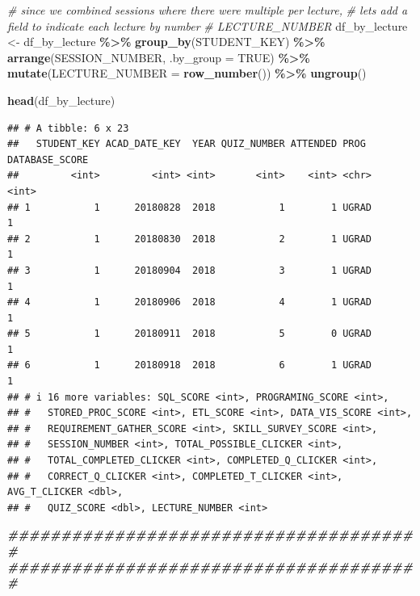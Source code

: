 \documentclass[
]{article}
\newenvironment{Shaded}{\begin{snugshade}}{\end{snugshade}}
\newcommand{\AttributeTok}[1]{\textcolor[rgb]{0.13,0.29,0.53}{#1}}
\newcommand{\CommentTok}[1]{\textcolor[rgb]{0.56,0.35,0.01}{\textit{#1}}}
\newcommand{\ConstantTok}[1]{\textcolor[rgb]{0.56,0.35,0.01}{#1}}
\newcommand{\DocumentationTok}[1]{\textcolor[rgb]{0.56,0.35,0.01}{\textbf{\textit{#1}}}}
\newcommand{\FunctionTok}[1]{\textcolor[rgb]{0.13,0.29,0.53}{\textbf{#1}}}
\newcommand{\NormalTok}[1]{#1}
\newcommand{\OtherTok}[1]{\textcolor[rgb]{0.56,0.35,0.01}{#1}}
\newcommand{\SpecialCharTok}[1]{\textcolor[rgb]{0.81,0.36,0.00}{\textbf{#1}}}
\begin{document}
\begin{Shaded}
\begin{Highlighting}[]
\CommentTok{\# since we combined sessions where there were multiple per lecture,}
\CommentTok{\# let\textquotesingle{}s add a field to indicate each lecture by number}
\CommentTok{\# LECTURE\_NUMBER}
\NormalTok{df\_by\_lecture }\OtherTok{\textless{}{-}}\NormalTok{ df\_by\_lecture }\SpecialCharTok{\%\textgreater{}\%}
  \FunctionTok{group\_by}\NormalTok{(STUDENT\_KEY) }\SpecialCharTok{\%\textgreater{}\%}
  \FunctionTok{arrange}\NormalTok{(SESSION\_NUMBER, }\AttributeTok{.by\_group =} \ConstantTok{TRUE}\NormalTok{) }\SpecialCharTok{\%\textgreater{}\%}
  \FunctionTok{mutate}\NormalTok{(}\AttributeTok{LECTURE\_NUMBER =} \FunctionTok{row\_number}\NormalTok{()) }\SpecialCharTok{\%\textgreater{}\%}
  \FunctionTok{ungroup}\NormalTok{()}

\FunctionTok{head}\NormalTok{(df\_by\_lecture)}
\end{Highlighting}
\end{Shaded}

\begin{verbatim}
## # A tibble: 6 x 23
##   STUDENT_KEY ACAD_DATE_KEY  YEAR QUIZ_NUMBER ATTENDED PROG  DATABASE_SCORE
##         <int>         <int> <int>       <int>    <int> <chr>          <int>
## 1           1      20180828  2018           1        1 UGRAD              1
## 2           1      20180830  2018           2        1 UGRAD              1
## 3           1      20180904  2018           3        1 UGRAD              1
## 4           1      20180906  2018           4        1 UGRAD              1
## 5           1      20180911  2018           5        0 UGRAD              1
## 6           1      20180918  2018           6        1 UGRAD              1
## # i 16 more variables: SQL_SCORE <int>, PROGRAMING_SCORE <int>,
## #   STORED_PROC_SCORE <int>, ETL_SCORE <int>, DATA_VIS_SCORE <int>,
## #   REQUIREMENT_GATHER_SCORE <int>, SKILL_SURVEY_SCORE <int>,
## #   SESSION_NUMBER <int>, TOTAL_POSSIBLE_CLICKER <int>,
## #   TOTAL_COMPLETED_CLICKER <int>, COMPLETED_Q_CLICKER <int>,
## #   CORRECT_Q_CLICKER <int>, COMPLETED_T_CLICKER <int>, AVG_T_CLICKER <dbl>,
## #   QUIZ_SCORE <dbl>, LECTURE_NUMBER <int>
\end{verbatim}

\begin{Shaded}
\begin{Highlighting}[]
\DocumentationTok{\#\#\#\#\#\#\#\#\#\#\#\#\#\#\#\#\#\#\#\#\#\#\#\#\#\#\#\#\#\#\#\#\#\#\#\#\#\#\#}
\DocumentationTok{\#\#\#\#\#\#\#\#\#\#\#\#\#\#\#\#\#\#\#\#\#\#\#\#\#\#\#\#\#\#\#\#\#\#\#\#\#\#\#}
\end{Highlighting}
\end{Shaded}
\end{document}
